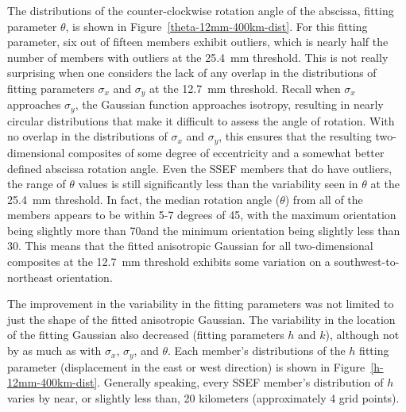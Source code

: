 The distributions of the counter-clockwise rotation angle of the abscissa, fitting parameter $\theta$, is shown in \mbox{Figure \ref{theta-12mm-400km-dist}}.
For this fitting parameter, six out of fifteen members exhibit outliers, which is nearly half the number of members with outliers at the \mbox{25.4 mm} threshold.
This is not really surprising when one considers the lack of any overlap in the distributions of fitting parameters $\sigma_x$ and $\sigma_y$ at the \mbox{12.7 mm} threshold.
Recall when $\sigma_x$ approaches $\sigma_y$, the Gaussian function approaches isotropy, resulting in nearly circular distributions that make it difficult to assess the angle of rotation.
With no overlap in the distributions of $\sigma_x$ and $\sigma_y$, this ensures that the resulting two-dimensional composites of some degree of eccentricity and a somewhat better defined abscissa rotation angle.
Even the SSEF members that do have outliers, the range of $\theta$ values is still significantly less than the variability seen in $\theta$ at the \mbox{25.4 mm} threshold.
In fact, the median rotation angle ($\theta$) from all of the members appears to be within 5-7 degrees of 45\degree, with the maximum orientation being slightly more than 70\degree and the minimum orientation being slightly less than 30\degree.
This means that the fitted anisotropic Gaussian for all two-dimensional composites at the \mbox{12.7 mm} threshold exhibits some variation on a southwest-to-northeast orientation.


The improvement in the variability in the fitting parameters was not limited to just the shape of the fitted anisotropic Gaussian.
The variability in the location of the fitting Gaussian also decreased (fitting parameters $h$ and $k$), although not by as much as with $\sigma_x$, $\sigma_y$, and $\theta$.
Each member's distributions of the $h$ fitting parameter (displacement in the east or west direction) is shown in \mbox{Figure \ref{h-12mm-400km-dist}}.
Generally speaking, every SSEF member's distribution of $h$ varies by near, or slightly less than, 20 kilometers (approximately 4 grid points).


